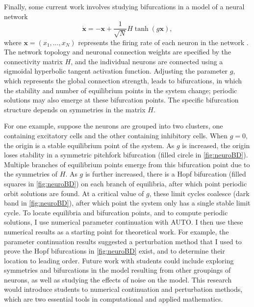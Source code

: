 \documentclass[12pt,reqno,oneside,hidelinks]{article}
\newcommand{\xvec}{\mathbf{x}}
\begin{document}
Finally, some current work involves studying bifurcations in a model of a neural network
\begin{equation*}
    \dot{\xvec} = -\xvec  + \frac{1}{\sqrt{N}} H\tanh (g \xvec),
\end{equation*}
where $\xvec = (x_1, \dots, x_N)$ represents the firing rate of each neuron in the network \cite{ParkerNeuro,Barreiro2017}. The network topology and neuronal connection weights are specified by the connectivity matrix $H$, and the individual neurons are connected using a sigmoidal hyperbolic tangent activation function. Adjusting the parameter $g$, which represents the global connection strength, leads to bifurcations, in which the stability and number of equilibrium points in the system change; periodic solutions may also emerge at these bifurcation points. The specific bifurcation structure depends on symmetries in the matrix $H$. 

For one example, suppose the neurons are grouped into two clusters, one containing excitatory cells and the other containing inhibitory cells. When $g = 0$, the origin is a stable equilibrium point of the system. As $g$ is increased, the origin loses stability in a symmetric pitchfork bifurcation (filled circle in \cref{fig:neuroBD}). Multiple branches of equilibrium points emerge from this bifurcation point due to the symmetries of $H$. As $g$ is further increased, there is a Hopf bifurcation (filled squares in \cref{fig:neuroBD}) on each branch of equilibria, after which point periodic orbit solutions are found. At a critical value of $g$, these limit cycles coalesce (dark band in \cref{fig:neuroBD}), after which point the system only has a single stable limit cycle. To locate equilibria and bifurcation points, and to compute periodic solutions, I use numerical parameter continuation with AUTO. I then use these numerical results as a starting point for theoretical work. For example, the parameter continuation results suggested a perturbation method that I used to prove the Hopf bifurcations in \cref{fig:neuroBD} exist, and to determine their location to leading order. Future work with students could include exploring symmetries and bifurcations in the model resulting from other groupings of neurons, as well as studying the effects of noise on the model. This research would introduce students to numerical continuation and perturbation methods, which are two essential tools in computational and applied mathematics.
\end{document}
